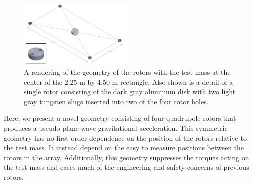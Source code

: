 \documentclass[superscriptaddress, twocolumn, prd]{revtex4-1}
\begin{document}
\begin{figure}[!h]
\centering \includegraphics[width=0.5\textwidth]{Super4_Model.pdf}
\caption{A rendering of the geometry of the rotors with the test mass at the center of the 2.25-m by 4.50-m rectangle. Also shown is a detail of a single rotor consisting of the dark gray aluminum disk with two light gray tungsten slugs inserted into two of the four rotor holes.}
\label{cad} 
\end{figure}

Here, we present a novel geometry consisting of four quadrupole rotors that produces a pseudo plane-wave gravitational acceleration. This symmetric geometry has no first-order dependence on the position of the rotors relative to the test mass. It instead depend on the easy to measure positions between the rotors in the array. Additionally, this geometry suppresses the torques acting on the test mass and eases much of the engineering and safety concerns of previous rotors.

%
%
%
\end{document}
